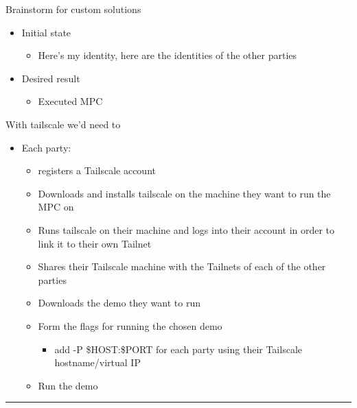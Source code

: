 \hypertarget{notes__03500-brainstorm.md}{}
\begin{frame}{Brainstorm for custom solutions}
\protect\hypertarget{notes__03500-brainstorm.md__brainstorm-for-custom-solutions}{}
\begin{itemize}
\tightlist
\item
  Initial state

  \begin{itemize}
  \tightlist
  \item
    Here's my identity, here are the identities of the other parties
  \end{itemize}
\item
  Desired result

  \begin{itemize}
  \tightlist
  \item
    Executed MPC
  \end{itemize}
\end{itemize}

With tailscale we'd need to

\begin{itemize}
\tightlist
\item
  Each party:

  \begin{itemize}
  \tightlist
  \item
    registers a Tailscale account
  \item
    Downloads and installs tailscale on the machine they want to run the
    MPC on
  \item
    Runs tailscale on their machine and logs into their account in order
    to link it to their own Tailnet
  \item
    Shares their Tailscale machine with the Tailnets of each of the
    other parties
  \item
    Downloads the demo they want to run
  \item
    Form the flags for running the chosen demo

    \begin{itemize}
    \tightlist
    \item
      add -P \$HOST:\$PORT for each party using their Tailscale
      hostname/virtual IP
    \end{itemize}
  \item
    Run the demo
  \end{itemize}
\end{itemize}

\begin{center}\rule{0.5\linewidth}{0.5pt}\end{center}


\end{frame}
